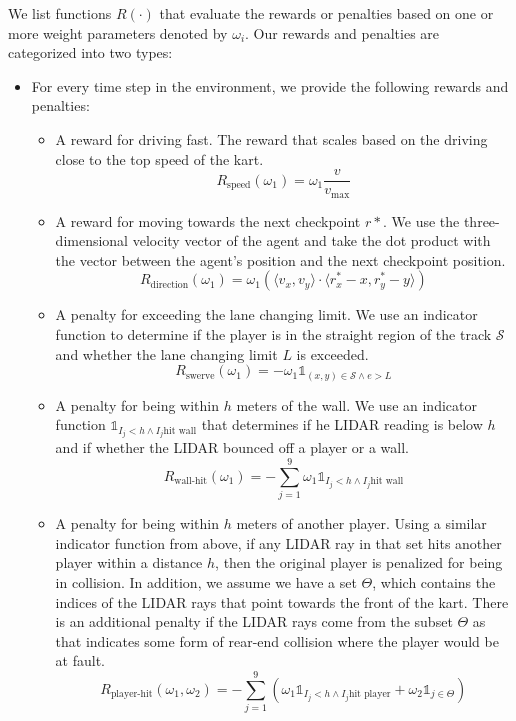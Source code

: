 We list functions $R(\cdot)$ that evaluate the rewards or penalties based on one or more weight parameters denoted by $\omega_i$. Our rewards and penalties are categorized into two types:
\begin{itemize}
\item For every time step in the environment, we provide the following rewards and penalties:
\begin{itemize}
    \item A reward for driving fast. The reward that scales based on the driving close to the top speed of the kart.
    \begin{equation*}
        R_{\text{speed}}(\omega_1) = \omega_1 \frac{v}{v_{\text{max}}}
    \end{equation*}
    \item A reward for moving towards the next checkpoint $r*$. We use the three-dimensional velocity vector of the agent and take the dot product with the vector between the agent's position and the next checkpoint position.
    \begin{equation*}
        R_{\text{direction}}(\omega_1) = \omega_1 (\langle v_x, v_y \rangle \cdot \langle r^*_x-x , r^*_y - y\rangle)
    \end{equation*}
    \item A penalty for exceeding the lane changing limit. We use an indicator function to determine if the player is in the straight region of the track $\mathcal{S}$ and whether the lane changing limit $L$ is exceeded.
    \begin{equation*}
        R_{\text{swerve}}(\omega_1) = -\omega_1 \mathds{1}_{(x,y) \in \mathcal{S} \wedge e > L}
    \end{equation*}
    \item A penalty for being within $h$ meters of the wall. We use an indicator function $\mathds{1}_{I_j < h \wedge I_j \text{hit wall}}$ that determines if he LIDAR reading is below $h$ and if whether the LIDAR bounced off a player or a wall.
    \begin{equation*}
        R_{\text{wall-hit}}(\omega_1) = -\sum_{j=1}^9 \omega_1 \mathds{1}_{I_j < h \wedge I_j \text{hit wall}}
    \end{equation*}
    \item A penalty for being within $h$ meters of another player. Using a similar indicator function from above, if any LIDAR ray in that set hits another player within a distance $h$, then the original player is penalized for being in collision. In addition, we assume we have a set $\Theta$, which contains the indices of the LIDAR rays that point towards the front of the kart. There is an additional penalty if the LIDAR rays come from the subset $\Theta$ as that indicates some form of rear-end collision where the player would be at fault. 
    \begin{equation*}
        R_{\text{player-hit}}(\omega_1, \omega_2) = -\sum_{j=1}^9 (\omega_1 \mathds{1}_{I_j < h \wedge I_j \text{hit player}} + \omega_2 \mathds{1}_{j \in \Theta})
    \end{equation*}
\end{itemize}


\end{itemize}
